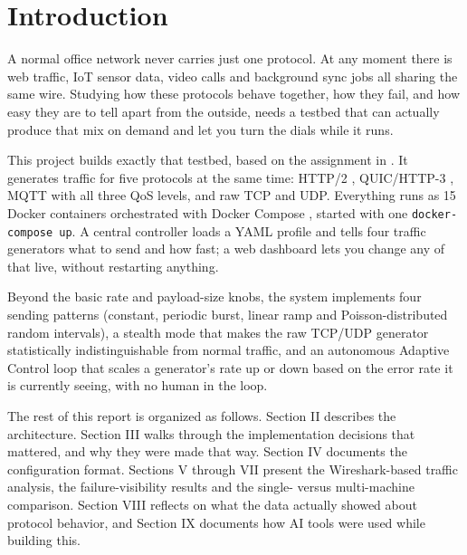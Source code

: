 \section{Introduction}

A normal office network never carries just one protocol. At any moment there is
web traffic, IoT sensor data, video calls and background sync jobs all sharing
the same wire. Studying how these protocols behave together, how they fail, and
how easy they are to tell apart from the outside, needs a testbed that can
actually produce that mix on demand and let you turn the dials while it runs.

This project builds exactly that testbed, based on the assignment in
\cite{hsrwassignment}. It generates traffic for five protocols at the same
time: HTTP/2 \cite{rfc7540}, QUIC/HTTP-3 \cite{rfc9000, rfc9114}, MQTT
\cite{mqtt5} with all three QoS levels, and raw TCP and UDP. Everything runs
as 15 Docker containers orchestrated with Docker Compose \cite{dockercompose},
started with one \texttt{docker-compose up}. A central controller loads a YAML profile
and tells four traffic generators what to send and how fast; a web dashboard
lets you change any of that live, without restarting anything.

Beyond the basic rate and payload-size knobs, the system implements four
sending patterns (constant, periodic burst, linear ramp and Poisson-distributed
random intervals), a stealth mode that makes the raw TCP/UDP generator
statistically indistinguishable from normal traffic, and an autonomous Adaptive
Control loop that scales a generator's rate up or down based on the error rate
it is currently seeing, with no human in the loop.

The rest of this report is organized as follows. Section II describes the
architecture. Section III walks through the implementation decisions that
mattered, and why they were made that way. Section IV documents the
configuration format. Sections V through VII present the Wireshark-based
traffic analysis, the failure-visibility results and the single- versus
multi-machine comparison. Section VIII reflects on what the data actually
showed about protocol behavior, and Section IX documents how AI tools were
used while building this.
